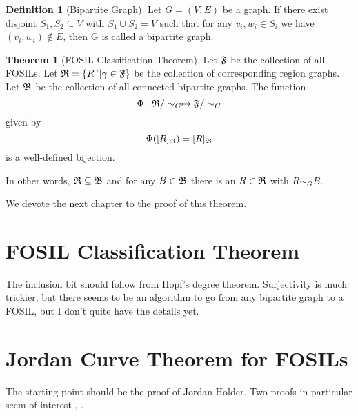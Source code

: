 \documentclass{article}
\theoremstyle{definition}
\newtheorem{definition}{Definition}
\theoremstyle{proposition}
\theoremstyle{theorem}
\newtheorem{theorem}{Theorem}
\begin{document}
\begin{definition}[Bipartite Graph]
Let $G=(V,E)$ be a graph. If there exist disjoint $S_{1}, S_{2} \subseteq V$ with $S_{1} \cup S_{2} = V$ such that for any $v_{i}, w_{i} \in S_{i}$ we have $(v_{i}, w_{i}) \notin E$, then G is called a bipartite graph.
\end{definition}

\begin{theorem}[FOSIL Classification Theorem]

Let $\frak{F}$ be the collection of all FOSILs. Let $\frak{R}=\{R^{\gamma} | \gamma \in \frak{F}\}$ be the collection of corresponding region graphs. Let $\frak{B}$ be the collection of all connected bipartite graphs. The function $$\Phi : \frak{R}/\sim_{G} \mapsto \frak{F}/\sim_{G}$$ given by $$\Phi([R]_{\frak{R}}) = [R]_{\frak{B}}$$ is a well-defined bijection.

In other words, $\frak{R} \subseteq \frak{B}$ and for any $B \in \frak{B}$ there is an $R \in \frak{R}$ with $R \sim_{G} B$.
\end{theorem}
We devote the next chapter to the proof of this theorem.

\section{FOSIL Classification Theorem}

The inclusion bit should follow from Hopf's degree theorem. Surjectivity is much trickier, but there seems to be an algorithm to go from any bipartite graph to a FOSIL, but I don't quite have the details yet.

\section{Jordan Curve Theorem for FOSILs}

The starting point should be the proof of Jordan-Holder. Two proofs in particular seem of interest \cite{hales07}, \cite{thomassen92}.



\end{document}

